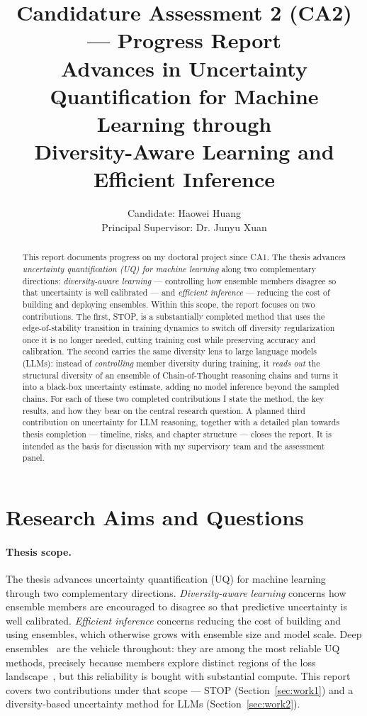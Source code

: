 \documentclass[11pt]{article}
\title{\textbf{Candidature Assessment 2 (CA2) --- Progress Report}\\[0.4em]
\large Advances in Uncertainty Quantification for Machine Learning through\\
Diversity-Aware Learning and Efficient Inference}
\author{Candidate: Haowei Huang \\ Principal Supervisor: Dr. Junyu Xuan \quad }
\begin{document}
\maketitle

\begin{abstract}
\noindent
This report documents progress on my doctoral project since CA1. The thesis advances
\emph{uncertainty quantification (UQ) for machine learning} along two complementary directions:
\emph{diversity-aware learning} --- controlling how ensemble members disagree so that
uncertainty is well calibrated --- and \emph{efficient inference} --- reducing the cost of
building and deploying ensembles. Within this scope, the report focuses on two contributions.
The first, STOP, is a substantially completed method that uses the edge-of-stability transition
in training dynamics to switch off diversity regularization once it is no longer needed, cutting
training cost while preserving accuracy and calibration. The second carries the same
diversity lens to large language models (LLMs): instead of \emph{controlling} member diversity
during training, it \emph{reads out} the structural diversity of an ensemble of Chain-of-Thought
reasoning chains and turns it into a black-box uncertainty estimate, adding no model inference
beyond the sampled chains. For each of these two completed contributions I state the method, the
key results, and how they bear on the central research question. A planned third contribution on
uncertainty for LLM reasoning, together with a detailed plan towards thesis completion --- timeline,
risks, and chapter structure --- closes the report. It is intended as the basis for discussion with my supervisory
team and the assessment panel.
\end{abstract}

\section{Research Aims and Questions}
\label{sec:aims}

\paragraph{Thesis scope.}
The thesis advances uncertainty quantification (UQ) for machine learning through two
complementary directions. \emph{Diversity-aware learning} concerns how ensemble members are
encouraged to disagree so that predictive uncertainty is well calibrated. \emph{Efficient
inference} concerns reducing the cost of building and using ensembles, which otherwise grows with
ensemble size and model scale. Deep ensembles~\cite{lakshminarayanan2017simplescalablepredictiveuncertainty}
are the vehicle throughout: they are among the most reliable UQ methods, precisely because members
explore distinct regions of the loss landscape~\cite{fort2020deepensembleslosslandscape}, but this
reliability is bought with substantial compute. This report covers two contributions under that
scope --- STOP (Section~\ref{sec:work1}) and a diversity-based uncertainty method for
LLMs (Section~\ref{sec:work2}).
\end{document}
